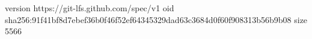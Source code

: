 version https://git-lfs.github.com/spec/v1
oid sha256:91f41bf8d7ebef36b0f46f52ef64345329dad63c3684d0f60f908313b56b9b08
size 5566
